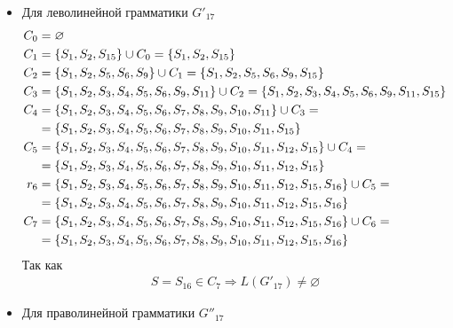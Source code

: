 \begin{itemize}
	\item Для леволинейной грамматики \(G'_{17}\)
	      \begin{align*}
		      C_0   & = \varnothing                                                                                                          \\
		      C_1   & = \left\{S_1, S_2, S_{15}\right\} \cup C_0 = \left\{S_1, S_2, S_{15}\right\}                                                             \\
		      C_{2} & = \left\{S_1, S_2, S_5, S_6, S_9\right\} \cup C_{1} = \left\{S_1, S_2, S_5, S_6, S_9, S_{15}\right\}                                     \\
		      C_{3} & = \left\{S_1, S_2, S_3, S_4, S_5, S_6, S_9, S_{11}\right\} \cup C_{2} = \left\{S_1, S_2, S_3, S_4, S_5, S_6, S_9, S_{11}, S_{15}\right\} \\
		      C_{4} & = \left\{S_1, S_2, S_3, S_4, S_5, S_6, S_7, S_8, S_9, S_{10}, S_{11}\right\} \cup C_{3} =                                       \\
		            & = \left\{S_1, S_2, S_3, S_4, S_5, S_6, S_7, S_8, S_9, S_{10}, S_{11}, S_{15}\right\}                                            \\
		      C_{5} & = \left\{S_1, S_2, S_3, S_4, S_5, S_6, S_7, S_8, S_9, S_{10}, S_{11}, S_{12}, S_{15}\right\} \cup C_{4} =                       \\
		            & = \left\{S_1, S_2, S_3, S_4, S_5, S_6, S_7, S_8, S_9, S_{10}, S_{11}, S_{12}, S_{15}\right\}                                    \\
		      r_{6} & = \left\{S_1, S_2, S_3, S_4, S_5, S_6, S_7, S_8, S_9, S_{10}, S_{11}, S_{12}, S_{15}, S_{16}\right\} \cup C_{5} =               \\
		            & = \left\{S_1, S_2, S_3, S_4, S_5, S_6, S_7, S_8, S_9, S_{10}, S_{11}, S_{12}, S_{15}, S_{16}\right\}                            \\
		      C_{7} & = \left\{S_1, S_2, S_3, S_4, S_5, S_6, S_7, S_8, S_9, S_{10}, S_{11}, S_{12}, S_{15}, S_{16}\right\} \cup C_{6} =               \\
		            & = \left\{S_1, S_2, S_3, S_4, S_5, S_6, S_7, S_8, S_9, S_{10}, S_{11}, S_{12}, S_{15}, S_{16}\right\}
	      \end{align*}
	      Так как
	      \begin{align}
		      S = S_{16} \in C_{7} \Longrightarrow L(G'_{17}) \not= \varnothing
	      \end{align}
	\item Для праволинейной грамматики \(G''_{17}\)

\end{itemize}
